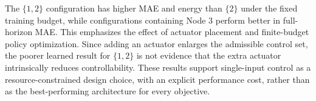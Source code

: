 The $\{1,2\}$ configuration has higher MAE and energy than $\{2\}$ under the fixed training budget, while configurations containing Node 3 perform better in full-horizon MAE. This emphasizes the effect of actuator placement and finite-budget policy optimization. Since adding an actuator enlarges the admissible control set, the poorer learned result for $\{1,2\}$ is not evidence that the extra actuator intrinsically reduces controllability. These results support single-input control as a resource-constrained design choice, with an explicit performance cost, rather than as the best-performing architecture for every objective.
